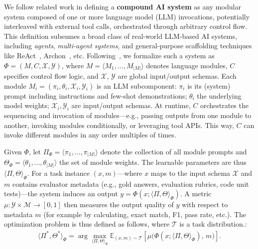 We follow related work in defining a \textbf{compound AI system} as any modular system composed of one or more language model (LLM) invocations, potentially interleaved with external tool calls, orchestrated through arbitrary control flow. This definition subsumes a broad class of real-world LLM-based AI systems, including \textit{agents}, \textit{multi-agent systems}, and general-purpose scaffolding techniques like ReAct~\citep{react}, Archon~\citep{archon}, etc.
Following~\citet{better_together,dspy,miprov2,langprobe}, we formalize such a system as $\Phi = (M, C, \mathcal{X}, \mathcal{Y})$, where $M = \langle M_1, \ldots, M_{|M|} \rangle$ denotes language modules, $C$ specifies control flow logic, and $\mathcal{X}$, $\mathcal{Y}$ are global input/output schemas. Each module $M_i = (\pi_i, \theta_i, \mathcal{X}_i, \mathcal{Y}_i)$ is an LLM subcomponent: $\pi_i$ is its (system) prompt including instructions and few-shot demonstrations; $\theta_i$ the underlying model weights; $\mathcal{X}_i, \mathcal{Y}_i$ are input/output schemas. At runtime, $C$ orchestrates the sequencing and invocation of modules---e.g., passing outputs from one module to another, invoking modules conditionally, or leveraging tool APIs. This way, $C$ can invoke different modules in any order multiples of times.

\label{par:formalizing_cais_optimization}
Given $\Phi$, let $\Pi_\Phi = \langle \pi_1, \ldots, \pi_{|M|}\rangle$ denote the collection of all module prompts and $\Theta_\Phi = \langle \theta_1, \ldots, \theta_{|M|}\rangle$ the set of module weights. The learnable parameters are thus $\langle \Pi, \Theta \rangle_\Phi$. For a task instance $(x, m)$---where $x$ maps to the input schema $\mathcal{X}$ and $m$ contains evaluator metadata (e.g., gold answers, evaluation rubrics, code unit tests)---the system induces an output $y = \Phi(x; \langle \Pi, \Theta \rangle_\Phi )$. A metric $\mu:\mathcal{Y} \times \mathcal{M} \to [0,1]$ then measures the output quality of $y$ with respect to metadata $m$ (for example by calculating, exact match, F1, pass rate, etc.). The optimization problem is thus defined as follows, where $\mathcal{T}$ is a task distribution.:
\begin{align}
    \langle \Pi^*, \Theta^* \rangle_\Phi = \arg\max_{\langle \Pi, \Theta \rangle_\Phi} \mathbb{E}_{(x, m) \sim \mathcal{T}} \left[ \mu\big( \Phi(x; \langle \Pi, \Theta \rangle_\Phi),\, m \big) \right].
\end{align}

